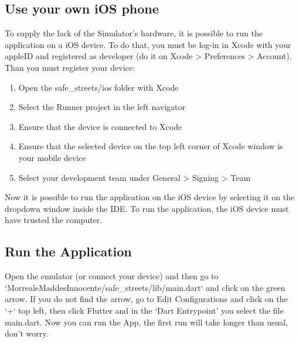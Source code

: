 \documentclass[../ITD.tex]{subfiles}
\begin{document}
    \subsection{Use your own iOS phone}\label{subsec:use-your-own-ios-phone}
    To supply the lack of the Simulator's hardware, it is possible to run the application on a iOS device.
    To do that, you must be log-in in Xcode with your appleID and registered as developer (do it on Xcode > Preferences > Account).
    Than you must register your device:
    \begin{enumerate}
        \item Open the safe\_streets/ios folder with Xcode
        \item Select the Runner project in the left navigator
        \item Ensure that the device is connected to Xcode
        \item Ensure that the selected device on the top left corner of Xcode window is your mobile device
        \item Select your development team under General > Signing > Team
    \end{enumerate}
    Now it is possible to run the application on the iOS device by selecting it on the dropdown window inside the IDE.
    To run the application, the iOS device must have trusted the computer.


    \subsection{Run the Application}\label{subsec:run-the-application}
    Open the emulator (or connect your device) and then go to\newline
    `MorrealeMaddesInnocente/safe\_streets/lib/main.dart` and click on the green arrow.
    If you do not find the arrow, go to Edit Configurations and click on the `+` top left,
    then click Flutter and in the `Dart Entrypoint' you select the file main.dart.
    Now you can run the App, the first run will take longer than usual, don't worry.
\end{document}
